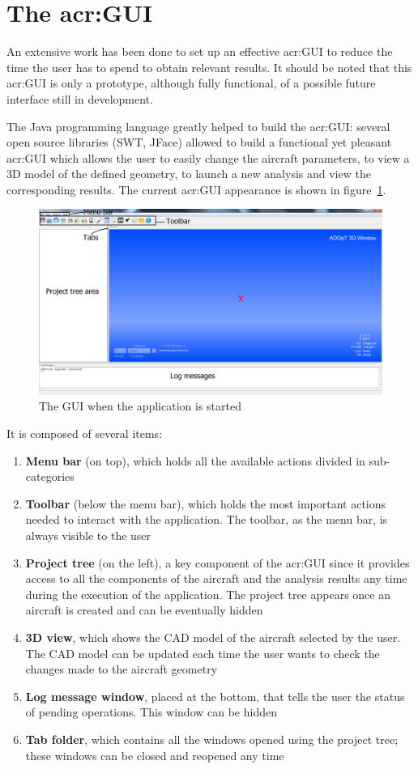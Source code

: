 \section{The \gls{acr:GUI}}
An extensive work has been done to set up an effective \gls{acr:GUI} to reduce the time the user has to spend to obtain relevant results. It should be noted that this \gls{acr:GUI} is only a prototype, although fully functional, of a possible future interface still in development.

\bigskip
\noindent
The Java programming language greatly helped to build the \gls{acr:GUI}: several open source libraries (SWT, JFace) allowed to build a functional yet pleasant \gls{acr:GUI} which allows the user to easily change the aircraft parameters, to view a 3D model of the defined geometry, to launch a new analysis and view the corresponding results. The current \gls{acr:GUI} appearance is shown in figure~\ref{fig:guiStart}. 
%
\begin{figure}[h]
	\centering
	\includegraphics[width=\textwidth]{images/gui/applicationStart}
	\caption{The GUI when the application is started}
	\label{fig:guiStart}
\end{figure}
%
It is composed of several items:
\begin{enumerate}
	\setlength{\itemsep}{\medspacing}
	\item \textbf{Menu bar} (on top), which holds all the available actions divided in sub-categories
	\item \textbf{Toolbar} (below the menu bar), which holds the most important actions needed to interact with the application. The toolbar, as the menu bar, is always visible to the user
	\item \textbf{Project tree} (on the left), a key component of the \gls{acr:GUI} since it provides access to all the components of the aircraft and the analysis results any time during the execution of the application. The project tree appears once an aircraft is created and can be eventually hidden
	\item \textbf{3D view}, which shows the CAD model of the aircraft selected by the user. The CAD model can be updated each time the user wants to check the changes made to the aircraft geometry
	\item \textbf{Log message window}, placed at the bottom, that tells the user the status of pending operations. This window can be hidden
	\item \textbf{Tab folder}, which contains all the windows opened using the project tree; these windows can be closed and reopened any time
\end{enumerate}
%
